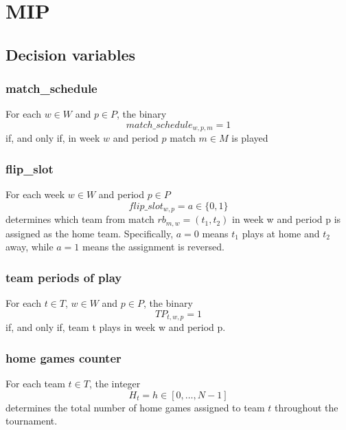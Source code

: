 \section{MIP}
\subsection{Decision variables}
\subsubsection{match\_schedule}
For each $w \in W$ and $p \in P$, the binary
$$
match\_schedule_{w,p,m} = 1
$$
if, and only if, in week $w$ and period $p$ match $m \in M$ is played 

\subsubsection{flip\_slot}
For each week $w \in W$ and period $p \in P$  
$$  
flip\_slot_{w,p} = a \in \{0, 1\}  
$$  
determines which team from match $rb_{m, w} = (t_1, t_2)$ in week w and period p is assigned as the home team. Specifically, $a = 0$ means $t_1$ plays at home and $t_2$ away, while $a = 1$ means the assignment is reversed.

\subsubsection{team periods of play}
For each $t \in T$, $w \in W$ and $p \in P$, the binary
$$
TP_{t,w,p} = 1
$$
if, and only if, team t plays in week w and period p.

\subsubsection{home games counter}
For each team $t \in T$, the integer  
$$  
H_t = h \in [0, \dots, N-1]
$$  
determines the total number of home games assigned to team $t$ throughout the tournament.

